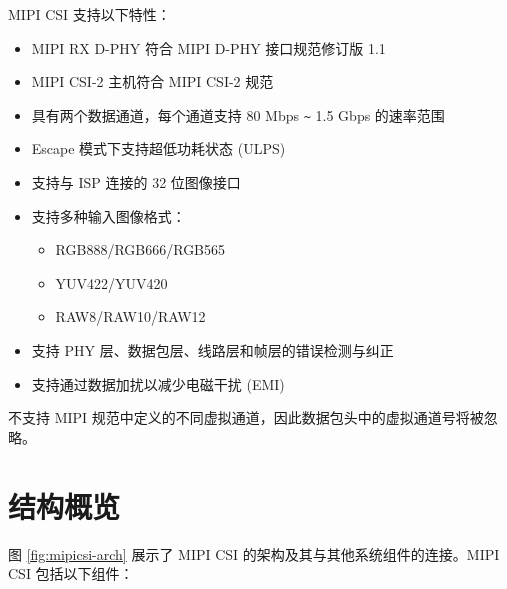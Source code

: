 \documentclass[main\_\_CN.tex]{subfiles}
\begin{document}
\chipname{} MIPI CSI 支持以下特性： 

\begin{itemize}
    \item MIPI RX D-PHY 符合 MIPI D-PHY 接口规范修订版 1.1
    \item MIPI CSI-2 主机符合 MIPI CSI-2 规范
    \item 具有两个数据通道，每个通道支持 80 Mbps \verb+~+ 1.5 Gbps 的速率范围
    \item Escape 模式下支持超低功耗状态 (ULPS)
    \item 支持与 ISP 连接的 32 位图像接口
    \item 支持多种输入图像格式：
        \begin{itemize}
            \item RGB888/RGB666/RGB565
            \item YUV422/YUV420
            \item RAW8/RAW10/RAW12
        \end{itemize}
    \item 支持 PHY 层、数据包层、线路层和帧层的错误检测与纠正
    \item 支持通过数据加扰以减少电磁干扰 (EMI)
\end{itemize}

\begin{tiplisting}
\chipname{} 不支持 MIPI 规范中定义的不同虚拟通道，因此数据包头中的虚拟通道号将被忽略。
\end{tiplisting}



\section{结构概览}
\label{sec:mipicsi-arch-overview}

图 \ref{fig:mipicsi-arch} 展示了 MIPI CSI 的架构及其与其他系统组件的连接。MIPI CSI 包括以下组件：
\end{document}
